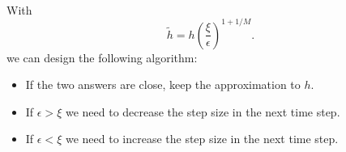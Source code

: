 \documentclass[%
oneside,                 %
final,                   %
10pt]{article}
\begin{document}
\paragraph{}
With 
\[
\tilde{h}=h\left(\frac{\xi}{\epsilon}\right)^{1+1/M}. 
\]
we can design the following algorithm:
\begin{itemize}
 \item If the two answers are close, keep the approximation to $h$.

 \item If $\epsilon > \xi$ we need to decrease the step size in the next time step.

 \item If $\epsilon < \xi$ we need to increase the step size in the next time step.
\end{itemize}

\noindent













\end{document}

